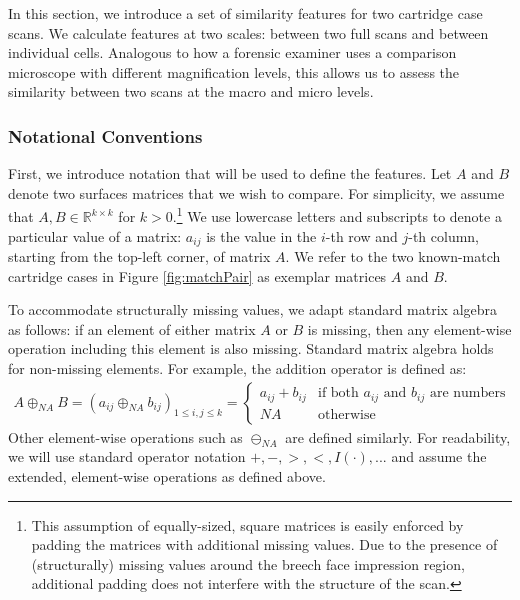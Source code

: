 \documentclass[11pt,]{isuthesis}
\let\rmarkdownfootnote\footnote%
\def\footnote{\protect\rmarkdownfootnote}
\begin{document}
In this section, we introduce a set of similarity features for two cartridge case scans.
We calculate features at two scales: between two full scans and between individual cells.
Analogous to how a forensic examiner uses a comparison microscope with different magnification levels, this allows us to assess the similarity between two scans at the macro and micro levels.

\hypertarget{notational-conventions-1}{%
\subsubsection{Notational Conventions}\label{notational-conventions-1}}

First, we introduce notation that will be used to define the features.
Let \(A\) and \(B\) denote two surfaces matrices that we wish to compare.
For simplicity, we assume that \(A,B \in \mathbb{R}^{k \times k}\) for \(k > 0\).\footnote{This assumption of equally-sized, square matrices is easily enforced by padding the matrices with additional missing values.
Due to the presence of (structurally) missing values around the breech face impression region, additional padding does not interfere with the structure of the scan.}
We use lowercase letters and subscripts to denote a particular value of a matrix: \(a_{ij}\) is the value in the \(i\)-th row and \(j\)-th column, starting from the top-left corner, of matrix \(A\).
We refer to the two known-match cartridge cases in Figure \ref{fig:matchPair} as exemplar matrices \(A\) and \(B\).

To accommodate structurally missing values, we adapt standard matrix algebra as follows: if an element of either matrix \(A\) or \(B\) is missing, then any element-wise operation including this element is also missing.
Standard matrix algebra holds for non-missing elements.
For example, the addition operator is defined as:
\begin{align*}
A \oplus_{NA} B = (a_{ij} \oplus_{NA} b_{ij})_{1 \leq i,j \leq k} = 
\begin{cases}
a_{ij} + b_{ij} & \text{if both $a_{ij}$ and $b_{ij}$ are numbers} \\
NA &\text{otherwise}
\end{cases}
\end{align*}
Other element-wise operations such as \(\ominus_{NA}\) are defined similarly.
For readability, we will use standard operator notation \(+, -, >, <, I(\cdot), ...\) and assume the extended, element-wise operations as defined above.
\end{document}
